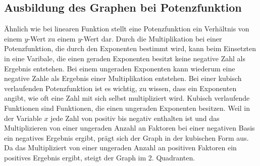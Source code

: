 \subsection{Ausbildung des Graphen bei Potenzfunktion}\label{sec:Potenzfunktionen/Ausbildung des Graphen bei Potenzfunktionen}
Ähnlich wie bei linearen Funktion stellt eine Potenzfunktion ein Verhältnis von einem $y$-Wert zu einem $y$-Wert dar. Durch die Multiplikation bei einer Potenzfunktion, die durch den Exponenten bestimmt wird, kann beim Einsetzten in eine Varibale, die einen geraden Exponenten besitzt keine negative Zahl als Ergebnis entstehen. Bei einem ungeraden Exponenten kann wiederum eine negative Zahle als Ergebnis einer Multiplikation entstehen. Bei einer kubisch verlaufenden Potenzfunktion ist es wichtig, zu wissen, dass ein Exponenten angibt, wie oft eine Zahl mit sich selbst multipliziert wird. Kubisch verlaufende Funktionen sind Funktionen, die einen ungeraden Exponenten besitzen. Weil in der Variable $x$ jede Zahl von positiv bis negativ enthalten ist und das Multiplizieren von einer ungeraden Anzahl an Faktoren bei einer negativen Basis ein negatives Ergebnis ergibt, prägt sich der Graph in der kubischen Form aus. Da das Multipliziert von einer ungeraden Anzahl an positiven Faktoren ein positives Ergebnis ergibt, steigt der Graph im 2. Quadranten. 



